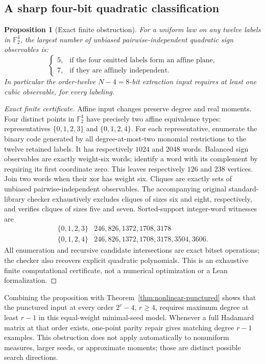 \documentclass[11pt]{article}
\newtheorem{proposition}[theorem]{Proposition}
\begin{document}
\subsection{A sharp four-bit quadratic classification}
\begin{proposition}[Exact finite obstruction]\label{prop:nonlinear-twelve-classification}
For a uniform law on any twelve labels in $\mathbb F_2^4$, the largest
number of unbiased pairwise-independent quadratic sign observables is:
\[
 \begin{cases}
 5,&\text{if the four omitted labels form an affine plane},\\
 7,&\text{if they are affinely independent}.
 \end{cases}
\]
In particular the order-twelve $N-4=8$-bit extraction input requires
at least one cubic observable, for every labeling.
\end{proposition}
\begin{proof}[Exact finite certificate]
Affine input changes preserve degree and real moments. Four distinct
points in $\mathbb F_2^4$ have precisely two affine equivalence types:
representatives $\{0,1,2,3\}$ and $\{0,1,2,4\}$.
For each representative, enumerate the binary code generated by all
degree-at-most-two monomial restrictions to the twelve retained labels.
It has respectively $1024$ and $2048$ words. Balanced sign observables
are exactly weight-six words; identify a word with its complement by
requiring its first coordinate zero. This leaves respectively $126$
and $238$ vertices. Join two words when their xor has weight six.
Cliques are exactly sets of unbiased pairwise-independent observables.
The accompanying original standard-library checker exhaustively excludes
cliques of sizes six and eight, respectively, and verifies cliques of
sizes five and seven. Sorted-support integer-word witnesses are
\[
 \begin{array}{c|l}
 \{0,1,2,3\}&246,826,1372,1708,3178\\
 \{0,1,2,4\}&246,826,1372,1708,3178,3504,3606.
 \end{array}
\]
All enumeration and recursive candidate intersections are exact bitset
operations; the checker also recovers explicit quadratic polynomials.
This is an exhaustive finite computational certificate, not a numerical
optimization or a Lean formalization.
\end{proof}
Combining the proposition with Theorem~\ref{thm:nonlinear-punctured}
shows that the punctured input at every order $2^r-4$, $r\ge4$, requires
maximum degree at least $r-1$ in this equal-weight minimal-seed model.
Whenever a full Hadamard matrix at that order exists, one-point parity
repair gives matching degree $r-1$ examples. This obstruction does not
apply automatically to nonuniform measures, larger seeds, or approximate
moments; those are distinct possible search directions.
\end{document}
